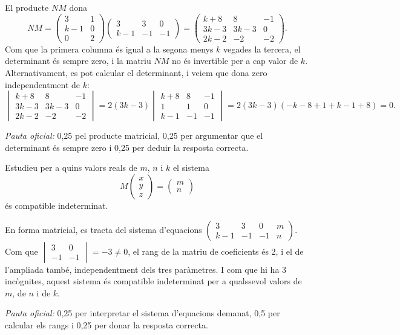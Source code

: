 \begin{apartats}
\begin{solucio}
El producte $NM$ dona
\[
NM=\begin{pmatrix}3&1\\k-1&0\\0&2\end{pmatrix}\begin{pmatrix}3&3&0\\k-1&-1&-1\end{pmatrix}
=\begin{pmatrix}k+8&8&-1\\3k-3&3k-3&0\\2k-2&-2&-2\end{pmatrix}.
\]
Com que la primera columna és igual a la segona menys $k$ vegades la tercera, el determinant és sempre zero,
i la matriu $NM$ no és invertible per a cap valor de $k$. Alternativament, es pot calcular el determinant, i
veiem que dona zero independentment de $k$:
\[
\begin{vmatrix}k+8&8&-1\\3k-3&3k-3&0\\2k-2&-2&-2\end{vmatrix}
=2(3k-3)\begin{vmatrix}k+8&8&-1\\1&1&0\\k-1&-1&-1\end{vmatrix}=2(3k-3)(-k-8+1+k-1+8)=0 .
\]

\textit{Pauta oficial:} 0,25 pel producte matricial, 0,25 per argumentar que el determinant és sempre zero
i 0,25 per deduir la resposta correcta.
\end{solucio}

Estudieu per a quins valors reals de $m$, $n$ i $k$ el sistema
\[
M\begin{pmatrix}x\\y\\z\end{pmatrix}=\begin{pmatrix}m\\n\end{pmatrix}
\]
és compatible indeterminat.

\begin{solucio}
En forma matricial, es tracta del sistema d'equacions
$\left(\begin{array}{ccc|c}3&3&0&m\\k-1&-1&-1&n\end{array}\right)$.
Com que $\begin{vmatrix}3&0\\-1&-1\end{vmatrix}=-3\neq0$, el rang de la matriu de coeficients és 2, i el de
l'ampliada també, independentment dels tres paràmetres. I com que hi ha 3 incògnites, aquest sistema és
compatible indeterminat per a qualssevol valors de $m$, de $n$ i de $k$.

\textit{Pauta oficial:} 0,25 per interpretar el sistema d'equacions demanat, 0,5 per calcular els rangs i
0,25 per donar la resposta correcta.
\end{solucio}

\end{apartats}
